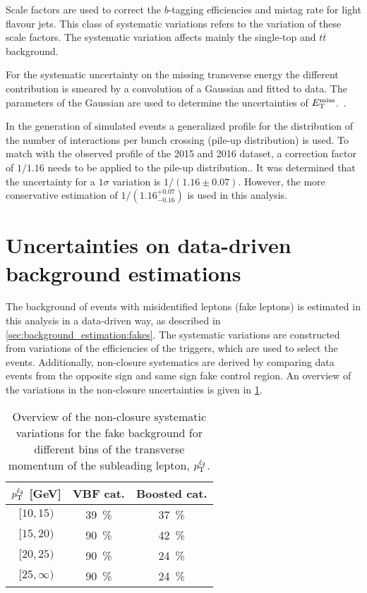 \begin{description}[leftmargin=0cm]
    \item[b-tagging:] Scale factors are used to correct the $b$-tagging efficiencies and mistag rate for light flavour jets.
        This class of systematic variations refers to the variation of these scale factors.
        The systematic variation affects mainly the single-top and $t\overline{t}$ background.
    \item[Transverse missing energy:] For the systematic uncertainty on the missing transverse energy the different
        contribution is smeared by a convolution of a Gaussian and fitted to data. The parameters of the Gaussian are used
        to determine the uncertainties of $E_\text{T}^\text{miss}$.~\cite{METUncertainty}.
    \item[Pile-up reweighting:] In the generation of simulated events a generalized profile for the distribution of the number of interactions
        per bunch crossing (pile-up distribution) is used. To match with the observed profile of the 2015 and 2016 dataset, a correction factor
        of $1/1.16$ needs to be applied to the pile-up distribution..
        It was determined that the uncertainty for a $1\sigma$ variation is $1/(1.16 \pm 0.07)$.
        However, the more conservative estimation of $1/(1.16^{+0.07}_{-0.16})$ is used in this analysis.
\end{description}

\section{Uncertainties on data-driven background estimations}\label{sec:systematics:bkg}

The background of events with misidentified leptons (fake leptons) is estimated in this analysis in a data-driven way,
as described in \cref{sec:background_estimation:fakes}.
The systematic variations are constructed from variations of the efficiencies of the triggers, which are used to select the events.
Additionally, non-closure systematics are derived by comparing data events from the opposite sign and same sign fake control region.
An overview of the variations in the non-closure uncertainties is given in \cref{tab:systematics:fake}.

\begin{table}[htpb]
    \centering
    \caption{Overview of the non-closure systematic variations for the fake background for different bins of the transverse momentum of the subleading lepton, $p_\text{T}^{\ell_2}$.}\label{tab:systematics:fake}
    \begin{tabular}{ccc}
        \toprule
        $p_\text{T}^{\ell_2}$ [GeV] & VBF cat. & Boosted cat. \\ \midrule
        $[10, 15)$        & \SI{39}{\percent} & \SI{37}{\percent} \\
        $[15, 20)$        & \SI{90}{\percent} & \SI{42}{\percent} \\
        $[20, 25)$        & \SI{90}{\percent} & \SI{24}{\percent} \\
        $[25, \infty)$    & \SI{90}{\percent} & \SI{24}{\percent} \\
        \bottomrule
    \end{tabular}
\end{table}

